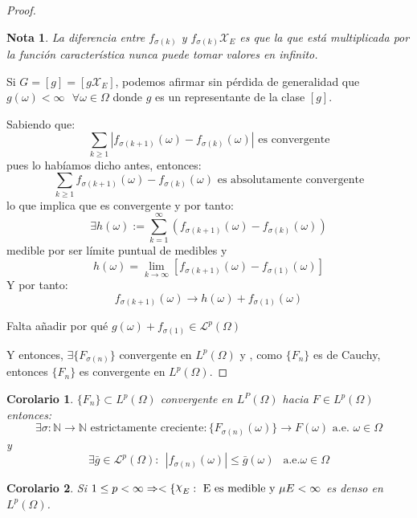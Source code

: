 \documentclass[11pt, a4paper]{article}
\DeclareRobustCommand{\rchi}{{\mathpalette\irchi\relax}}
\newcommand{\irchi}[2]{\raisebox{\depth}{$#1\chi$}} %
\theoremstyle{theorem-style}
\newtheorem{ncor}{Corolario}[section]
\theoremstyle{definition-style}
\theoremstyle{remark-style}
\newtheorem*{nota}{Nota}
\theoremstyle{example-style}
\begin{document}
\begin{proof}
  \begin{nota}
    La diferencia entre  $f_{\sigma(k)}$ y $f_{\sigma(k)}\mathcal X _E$ es que la que está multiplicada por la función característica nunca puede tomar valores en infinito.
  \end{nota}
  
  Si $G = [g] = [g \mathcal X _E]$, podemos afirmar sin pérdida de generalidad que $g(\omega) < \infty \ \ \ \forall \omega \in \Omega$ donde $g$ es un representante de la clase $[g]$.
  
  Sabiendo que:
  \[
    \sum_{k \geq 1} |f_{\sigma(k+1)}(\omega) - f_{\sigma(k)}(\omega)| \text{ es convergente}
  \]	
  pues lo habíamos dicho antes, entonces:
  \[
    \sum_{k \geq 1} f_{\sigma(k+1)}(\omega) - f_{\sigma(k)}(\omega) \text{ es absolutamente convergente}
  \]
  lo que implica que es convergente y por tanto:
  \[
    \exists h(\omega):= \sum_{k=1}^\infty (f_{\sigma(k+1)}(\omega) - f_{\sigma(k)}(\omega))
  \]
  medible por ser límite puntual de medibles y 
  \[
    h(\omega) = \lim_{k \to \infty}[f_{\sigma(k+1)}(\omega) -f_{\sigma(1)}(\omega)]
  \]
  Y por tanto:
  \[
    f_{\sigma(k+1)}(\omega) \to h(\omega) + f_{\sigma(1)}(\omega)
  \]
  
  Falta añadir por qué $g(\omega) + f_{\sigma(1)} \in \mathcal L ^p (\Omega)$
  
  
  
  
  Y entonces, $\exists \{ F_{\sigma(n)}\}$ convergente en $L^p(\Omega)$ y , como $\{F_n\}$ es de Cauchy, entonces $\{F_n\}$ es convergente en $L^p(\Omega)$.
\end{proof}


\begin{ncor} \label{jose}
  $\{F_n\} \subset  L ^p (\Omega)$ convergente en $L^P(\Omega)$ hacia $F \in L^p(\Omega)$ entonces:
  \[
    \exists \sigma : \mathbb N \to \mathbb N \text{ estrictamente creciente} : \{F_{\sigma(n)}(\omega)\}\to F(\omega) \text{ a.e. } \omega \in \Omega
  \]
  y
  \[
    \exists \bar g \in \mathcal L ^p (\Omega) : \ \ |f_{\sigma(n)}(\omega)| \leq \bar g (\omega) \ \ \text{ a.e.} \omega \in \Omega
  \]
\end{ncor}

\begin{ncor}
  Si $1 \leq p < \infty \Rightarrow < \{\rchi_{E} : \text{ E es medible y } \mu{E} < \infty$ es denso en $L^{p}(\Omega)$.
\end{ncor}
\end{document}
